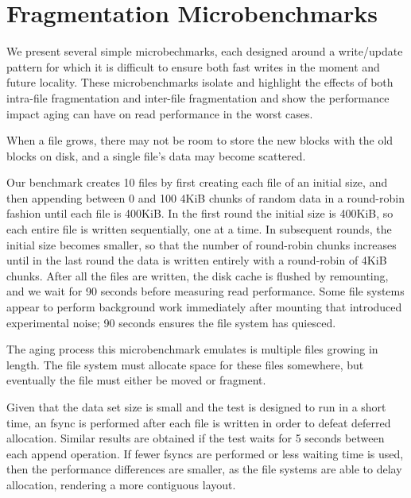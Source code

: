 \section{Fragmentation Microbenchmarks}\label{sec:fsa-microbenchmarks}

We present several simple microbechmarks, each designed around a write/update
pattern for which it is difficult to ensure both fast writes in the moment and
future locality.  These microbenchmarks isolate and highlight the effects of
both intra-file fragmentation and inter-file fragmentation and show the
performance impact aging can have on read performance in the worst cases.

 When a file grows, there may not
be room to store the new blocks with the old blocks on disk, and a
single file's data may become scattered.  %

Our benchmark creates 10 files by first creating each file of an initial size,
and then appending between 0 and 100 4KiB chunks of random data in a
round-robin fashion until each file is 400KiB.  In the first round the initial
size is 400KiB, so each entire file is written sequentially, one at a time. In
subsequent rounds, the initial size becomes smaller, so that the number of
round-robin chunks increases until in the last round the data is written
entirely with a round-robin of 4KiB chunks. After all the files are written,
the disk cache is flushed by remounting, and we wait for 90 seconds before
measuring read performance.  Some file systems appear to perform background
work immediately after mounting that introduced experimental noise; 90 seconds
ensures the file system has quiesced.

The aging process this microbenchmark emulates is multiple files growing in
length. The file system must allocate space for these files somewhere, but
eventually the file must either be moved or fragment.

Given that the data set size is small and the test is designed to run in a
short time, an fsync is performed after each file is written in order to defeat
deferred allocation. Similar results are obtained if the test waits for 5
seconds between each append operation. If fewer fsyncs are performed or less
waiting time is used, then the performance differences are 
smaller, as the file systems are
able to delay allocation, rendering a more contiguous layout.

